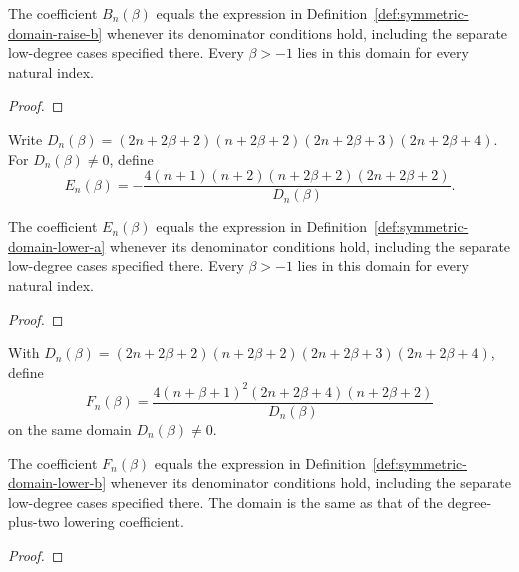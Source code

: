 \begin{supporting}
\begin{theorem}
\label{thm:symmetric-domain-raise-b}
\leanok
The coefficient $B_n(\beta)$ equals the expression in Definition~\ref{def:symmetric-domain-raise-b} whenever its denominator conditions hold, including the separate low-degree cases specified there.
Every $\beta>-1$ lies in this domain for every natural index.
\end{theorem}
\begin{proof}
\leanok
\end{proof}

\begin{definition}
\label{def:symmetric-domain-lower-a}
\leanok
Write $D_n(\beta)=(2n+2\beta+2)(n+2\beta+2)(2n+2\beta+3)(2n+2\beta+4)$. For $D_n(\beta)\ne0$, define
\[
 E_n(\beta)=-\frac{4(n+1)(n+2)(n+2\beta+2)(2n+2\beta+2)}{D_n(\beta)}.
\]
\end{definition}

\begin{theorem}
\label{thm:symmetric-domain-lower-a}
\leanok
The coefficient $E_n(\beta)$ equals the expression in Definition~\ref{def:symmetric-domain-lower-a} whenever its denominator conditions hold, including the separate low-degree cases specified there.
Every $\beta>-1$ lies in this domain for every natural index.
\end{theorem}
\begin{proof}
\leanok
\end{proof}

\begin{definition}
\label{def:symmetric-domain-lower-b}
\leanok
With $D_n(\beta)=(2n+2\beta+2)(n+2\beta+2)(2n+2\beta+3)(2n+2\beta+4)$, define
\[
 F_n(\beta)=\frac{4(n+\beta+1)^2(2n+2\beta+4)(n+2\beta+2)}{D_n(\beta)}
\]
on the same domain $D_n(\beta)\ne0$.
\end{definition}

\begin{theorem}
\label{thm:symmetric-domain-lower-b}
\leanok
The coefficient $F_n(\beta)$ equals the expression in Definition~\ref{def:symmetric-domain-lower-b} whenever its denominator conditions hold, including the separate low-degree cases specified there.
The domain is the same as that of the degree-plus-two lowering coefficient.
\end{theorem}
\begin{proof}
\leanok
\end{proof}


\end{supporting}
